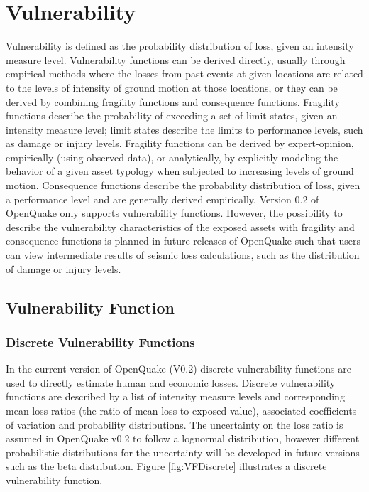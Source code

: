 \section{Vulnerability}
Vulnerability is defined as the probability distribution of loss, given an intensity measure level. Vulnerability functions can be derived directly, usually through empirical methods where the losses from past events at given locations are related to the levels of intensity of ground motion at those locations, or they can be derived by combining fragility functions and consequence functions. Fragility functions describe the probability of exceeding a set of limit states, given an intensity measure level; limit states describe the limits to performance levels, such as damage or injury levels. Fragility functions can be derived by expert-opinion, empirically (using observed data), or analytically, by explicitly modeling the behavior of a given asset typology when subjected to increasing levels of ground motion. Consequence functions describe the probability distribution of loss, given a performance level and are generally derived empirically. 
Version 0.2 of OpenQuake only supports vulnerability functions. However, the possibility to describe the vulnerability characteristics of the exposed assets with fragility and consequence functions is planned in future releases of OpenQuake such that users can view intermediate results of seismic loss calculations, such as the distribution of damage or injury levels. 

\subsection{Vulnerability Function}
\subsubsection{Discrete Vulnerability Functions}
In the current version of OpenQuake (V0.2) discrete vulnerability functions are used to directly estimate human and economic losses. Discrete vulnerability functions are described by a list of intensity measure levels and corresponding mean loss ratios (the ratio of mean loss to exposed value), associated coefficients of variation and probability distributions. The uncertainty on the loss ratio is assumed in OpenQuake v0.2 to follow a lognormal distribution, however different probabilistic distributions for the uncertainty will be developed in future versions such as the beta distribution. Figure \ref{fig:VFDiscrete} illustrates a discrete vulnerability function.

